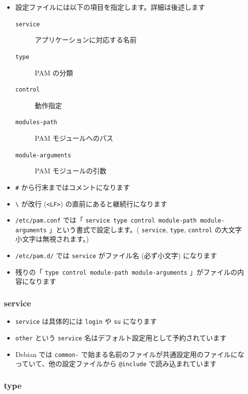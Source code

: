 \documentclass[mingoth,a4paper]{jsarticle}
\begin{document}
\begin{itemize}
\item 設定ファイルには以下の項目を指定します。詳細は後述します
\begin{description}
\item[\verb~service~] アプリケーションに対応する名前
\item[\verb~type~] PAM の分類
\item[\verb~control~] 動作指定
\item[\verb~modules-path~] PAM モジュールへのパス
\item[\verb~module-arguments~] PAM モジュールの引数
\end{description}
\item \verb~#~ から行末まではコメントになります
\item \verb~\~ が改行 (\verb~<LF>~) の直前にあると継続行になります
\item \verb~/etc/pam.conf~ では「 \verb~service type control module-path module-arguments~ 」という書式で設定します。( \verb~service~, \verb~type~, \verb~control~ の大文字小文字は無視されます。)
\item \verb~/etc/pam.d/~ では \verb~service~ がファイル名 (必ず小文字) になります
\item 残りの「 \verb~type control module-path module-arguments~ 」がファイルの内容になります
\end{itemize}
\subsubsection{service}
\label{sec-1-3-1}

\begin{itemize}
\item \verb~service~ は具体的には \verb~login~ や \verb~su~ になります
\item \verb~other~ という \verb~service~ 名はデフォルト設定用として予約されています
\item Debian では \verb~common-~ で始まる名前のファイルが共通設定用のファイルになっていて、他の設定ファイルから \verb~@include~ で読み込まれています
\end{itemize}
\subsubsection{type}
\label{sec-1-3-2}
\end{document}
